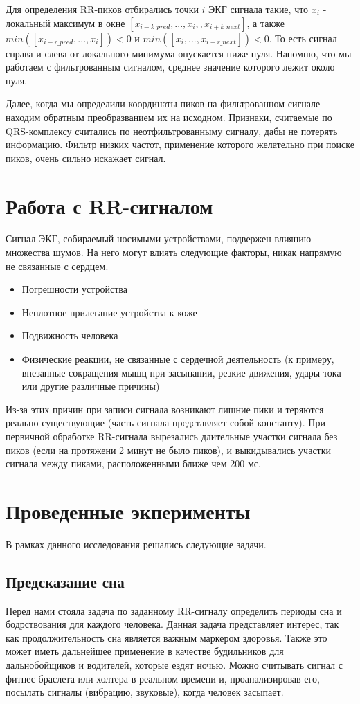 Для определения RR-пиков отбирались точки $i$ ЭКГ сигнала такие, что $x_i$ - локальный максимум в окне $[x_{i-k\_pred}, ..., x_i,    , x_{i+k\_next}]$, а также $min([x_{i-r\_pred}, ..., x_i])<0$ и $min([x_i, ..., x_{i+r\_next}])<0$. То есть сигнал справа и слева от локального минимума опускается ниже нуля. Напомню, что мы работаем с фильтрованным сигналом, среднее значение которого лежит около нуля.

Далее, когда мы определили координаты пиков на фильтрованном сигнале - находим обратным преобразванием их на исходном. Признаки, считаемые по QRS-комплексу считались по неотфильтрованныму сигналу, дабы не потерять информацию. Фильтр низких частот, применение которого желательно при поиске пиков, очень сильно искажает сигнал. 

\section{Работа с RR-сигналом}

Сигнал ЭКГ, собираемый носимыми устройствами, подвержен влиянию множества шумов. На него могут влиять следующие факторы, никак напрямую не связанные с сердцем.

\begin{itemize}
	\item Погрешности устройства
	\item Неплотное прилегание устройства к коже
	\item Подвижность человека
	\item Физические реакции, не связанные с сердечной деятельность (к примеру, внезапные сокращения мышц при засыпании, резкие движения, удары тока или другие различные причины)
\end{itemize}

Из-за этих причин при записи сигнала возникают лишние пики и теряются реально существующие (часть сигнала представляет собой константу). При первичной обработке RR-сигнала вырезались длительные участки сигнала без пиков (если на протяжени 2 минут не было пиков), и выкидывались участки сигнала между пиками, расположенными ближе чем 200 мс.


\section{Проведенные экперименты}

В рамках данного исследования решались следующие задачи.

\subsection{Предсказание сна}
Перед нами стояла задача по заданному RR-сигналу определить периоды сна и бодрствования для каждого человека. Данная задача представляет интерес, так как продолжительность сна является важным маркером здоровья. Также это может иметь дальнейшее применение в качестве будильников для дальнобойщиков и водителей, которые ездят ночью. Можно считывать сигнал с фитнес-браслета или холтера в реальном времени и, проанализировав его, посылать сигналы (вибрацию, звуковые), когда человек засыпает.

